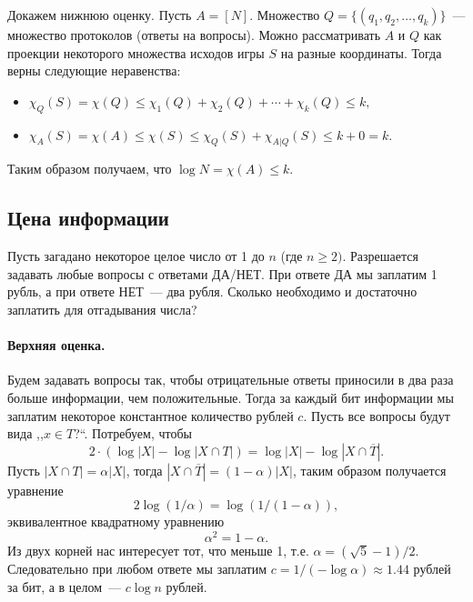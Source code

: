 \documentclass[12pt]{article}
\newcommand{\seqn}[2]{{#1}_1,{#1}_2,\dotsc,{#1}_{#2}}
\theoremstyle{definition}
\theoremstyle{plain}
\theoremstyle{remark}
\begin{document}
Докажем нижнюю оценку. Пусть \(A=[N]\). Множество \(Q = \{(\seqn{q}{k})\}\)~--- множество протоколов (ответы на вопросы). 
Можно рассматривать \(A\) и \(Q\) как проекции некоторого множества исходов игры \(S\) на разные координаты. Тогда верны следующие неравенства:
\begin{itemize}
\item \( \chi_Q(S) = \chi(Q) \le \chi_1(Q) + \chi_2(Q) + \dotsb + \chi_k(Q) \le k, \)
\item \( \chi_A(S) = \chi(A) \le \chi(S) \le \chi_Q(S) + \chi_{A|Q}(S) \le k + 0 = k. \)
\end{itemize}
Таким образом получаем, что \(\log N = \chi(A) \le k\).

\subsection{Цена информации}
Пусть загадано некоторое целое число от 1 до \(n\) (где \(n\ge2)\).
Разрешается задавать любые вопросы с ответами ДА/НЕТ. При ответе ДА мы
заплатим 1 рубль, а при ответе НЕТ~— два рубля. Сколько необходимо и достаточно заплатить для отгадывания числа?

\paragraph{Верхняя оценка.} Будем задавать вопросы так, чтобы отрицательные ответы приносили в два раза больше информации, чем положительные. Тогда за каждый бит информации мы заплатим некоторое константное количество рублей \(c\). Пусть все вопросы будут вида ,,\(x\in T\)?``. Потребуем, чтобы
\[2\cdot(\log |X| - \log|X \cap T|) = \log |X| - \log|X\cap\overline T|.\]
Пусть \(|X \cap T| = \alpha|X|\), тогда \(|X\cap\overline T| = (1 - \alpha)|X|\),
таким образом получается уравнение 
\[2\log (1/\alpha) = \log (1/(1-\alpha)),\]
эквивалентное квадратному уравнению
\[\alpha^2 = 1 - \alpha.\] Из двух корней нас интересует тот, что меньше 1, т.е. \(\alpha=(\sqrt 5 - 1) / 2\). Следовательно при любом ответе мы заплатим \(c = 1/(-\log \alpha)\approx 1.44\) рублей за бит, а в целом~— \(c\log n\) рублей.
\end{document}

